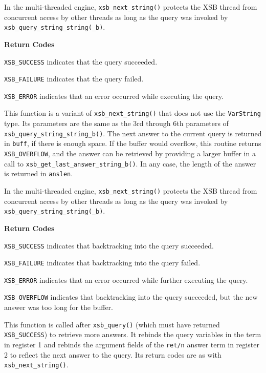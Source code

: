 \begin{description}
In the multi-threaded engine, {\tt xsb\_next\_string()} protects the
XSB thread from concurrent access by other threads as long as the
query was invoked by {\tt xsb\_query\_string\_string(\_b)}.

{\bf Return Codes}  
\bi
\item {\tt XSB\_SUCCESS} indicates that the query succeeded.
%
\item {\tt XSB\_FAILURE} indicates that the query failed.
%
\item {\tt XSB\_ERROR} indicates that an error occurred while
  executing the query.  
%
\ei

  
%
This function is a variant of {\tt xsb\_next\_string()} that does not
use the {\tt VarString} type.  Its parameters are the same as the 3rd
through 6th parameters of {\tt xsb\_query\_string\_string\_b()}.  The
next answer to the current query is returned in \verb|buff|, if there
is enough space.  If the buffer would overflow, this routine returns
{\tt XSB\_OVERFLOW}, and the answer can be retrieved by providing a
larger buffer in a call to {\tt xsb\_get\_last\_answer\_string\_b()}.
In any case, the length of the answer is returned in \verb|anslen|.

In the multi-threaded engine, {\tt xsb\_next\_string()} protects the
XSB thread from concurrent access by other threads as long as the
query was invoked by {\tt xsb\_query\_string\_string(\_b)}.

{\bf Return Codes}  
\bi
\item {\tt XSB\_SUCCESS} indicates that backtracking into the query succeeded.
%
\item {\tt XSB\_FAILURE} indicates that backtracking into the query failed.
%
\item {\tt XSB\_ERROR} indicates that an error occurred while further
  executing the query.

\item {\tt XSB\_OVERFLOW} indicates that backtracking into the query succeeded, but the
  new answer was too long for the buffer.
%
\ei

  
%
This function is called after {\tt xsb\_query()} (which must have
returned {\tt XSB\_SUCCESS}) to retrieve more answers.  It rebinds the
query variables in the term in register 1 and rebinds the argument
fields of the {\tt ret/n} answer term in register 2 to reflect the
next answer to the query.  Its return codes are as with {\tt
  xsb\_next\_string()}.


\end{description}
